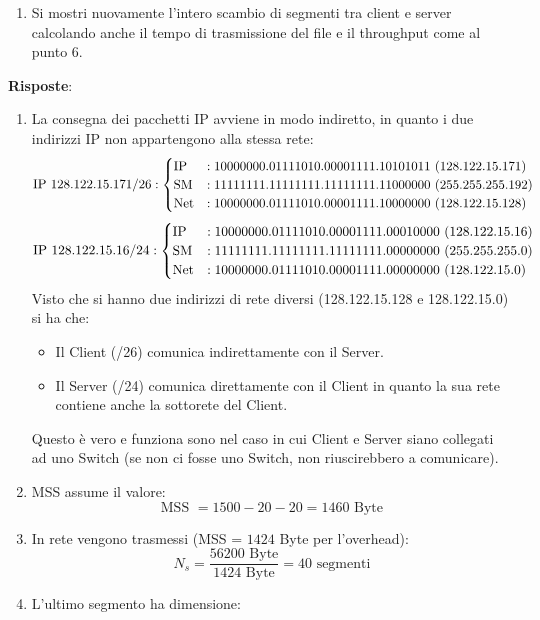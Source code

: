 \documentclass[10pt,a4paper]{article}
\begin{document}
	\begin{enumerate}[resume]
		\item Si mostri nuovamente l'intero scambio di segmenti tra client e server calcolando anche il tempo di trasmissione del file e il throughput come al punto 6.
	\end{enumerate}
	\textbf{Risposte}:
	\begin{enumerate}
		\item La consegna dei pacchetti IP avviene in modo indiretto, in quanto i due indirizzi IP non appartengono alla stessa rete:
			\[
				\textnormal{IP } 128.122.15.171/26:
				\begin{cases}
					\textnormal{IP} & : 10000000.01111010.00001111.10101011 \,\,(128.122.15.171)\\
					\textnormal{SM} & : 11111111.11111111.11111111.11000000 \,\,(255.255.255.192) \\
					\textnormal{Net} & : 10000000.01111010.00001111.10000000 \,\,(128.122.15.128)
				\end{cases}
			\]
			\[
				\textnormal{IP } 128.122.15.16/24:
				\begin{cases}
					\textnormal{IP} & : 10000000.01111010.00001111.00010000 \,\,(128.122.15.16)\\
					\textnormal{SM} & : 11111111.11111111.11111111.00000000 \,\,(255.255.255.0) \\
					\textnormal{Net} & : 10000000.01111010.00001111.00000000 \,\,( 128.122.15.0)
				\end{cases}
			\]
			Visto che si hanno due indirizzi di rete diversi (128.122.15.128 e 128.122.15.0) si ha che:
			\begin{itemize}
				\item Il Client (/26) comunica indirettamente con il Server.
				\item Il Server (/24) comunica direttamente con il Client in quanto la sua rete contiene anche la sottorete del Client.
			\end{itemize}
			Questo è vero e funziona sono nel caso in cui Client e Server siano collegati ad uno Switch (se non ci fosse uno Switch, non riuscirebbero a comunicare).
		\item MSS assume il valore: $$\textrm{MSS } = 1500 - 20 - 20 = 1460 \textrm{ Byte}$$
		\item In rete vengono trasmessi (MSS = $1424$ Byte per l'overhead):
		$$ N_{s} =  \frac{56200 \textrm{ Byte}}{1424 \textrm{ Byte}} = 40 \textrm{ segmenti}$$
		\item L'ultimo segmento ha dimensione: 

\end{enumerate}
\end{document}
